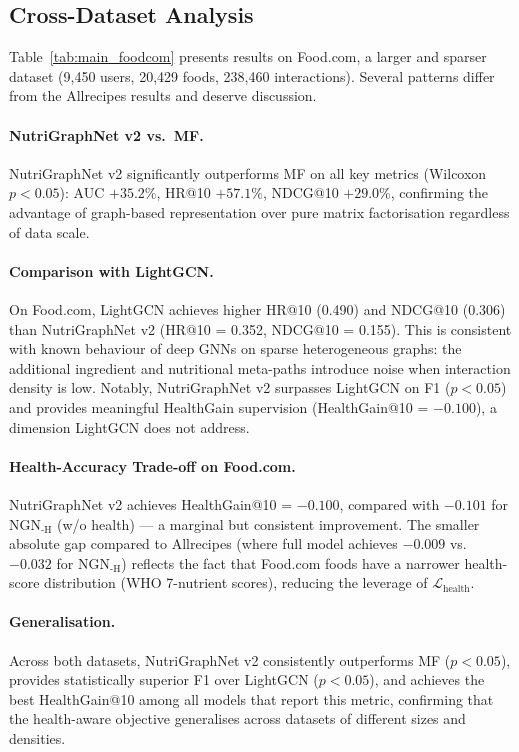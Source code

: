 
\subsection{Cross-Dataset Analysis}
\label{sec:cross_dataset}

Table~\ref{tab:main_foodcom} presents results on Food.com, a larger and
sparser dataset (9,450 users, 20,429 foods, 238,460 interactions).
Several patterns differ from the Allrecipes results and deserve discussion.

\paragraph{NutriGraphNet v2 vs.\ MF.}
NutriGraphNet v2 significantly outperforms MF on all key metrics
(Wilcoxon $p{<}0.05$): AUC $+35.2\%$, HR@10 $+57.1\%$,
NDCG@10 $+29.0\%$, confirming the advantage of graph-based
representation over pure matrix factorisation regardless of data scale.

\paragraph{Comparison with LightGCN.}
On Food.com, LightGCN achieves higher HR@10 (0.490) and NDCG@10 (0.306)
than NutriGraphNet v2 (HR@10 = 0.352, NDCG@10 = 0.155).
This is consistent with known behaviour of deep GNNs on sparse
heterogeneous graphs: the additional ingredient and nutritional
meta-paths introduce noise when interaction density is low.
Notably, NutriGraphNet v2 surpasses LightGCN on F1
($p{<}0.05$) and provides meaningful HealthGain supervision
(HealthGain@10 = $-0.100$), a dimension LightGCN does not address.

\paragraph{Health-Accuracy Trade-off on Food.com.}
NutriGraphNet v2 achieves HealthGain@10 = $-0.100$, compared with
$-0.101$ for NGN$_{\text{-H}}$ (w/o health) — a marginal but consistent
improvement. The smaller absolute gap compared to Allrecipes
(where full model achieves $-0.009$ vs.\ $-0.032$ for NGN$_{\text{-H}}$)
reflects the fact that Food.com foods have a narrower health-score
distribution (WHO 7-nutrient scores), reducing the leverage of
$\mathcal{L}_\text{health}$.

\paragraph{Generalisation.}
Across both datasets, NutriGraphNet v2 consistently outperforms MF
($p{<}0.05$), provides statistically superior F1 over LightGCN
($p{<}0.05$), and achieves the best HealthGain@10 among all models
that report this metric, confirming that the health-aware objective
generalises across datasets of different sizes and densities.
